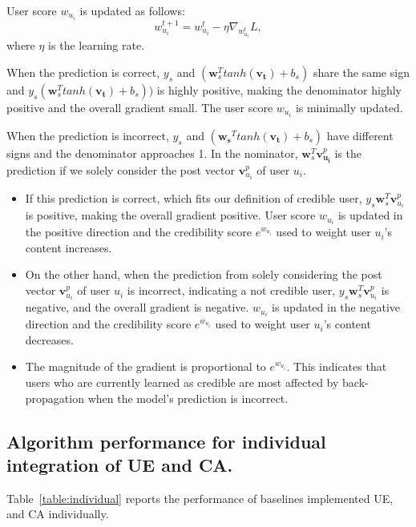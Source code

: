 \documentclass{bmcart}
\begin{document}
User score $w_{u_i}$ is updated as follows: 
\begin{equation}
    w^{t+1}_{u_i} = w^{t}_{u_i} - \eta\nabla_{w^{t}_{u_i}}L,
\end{equation}
where $\eta$ is the learning rate.

When the prediction is correct, $y_s$ and $(\boldsymbol{w}_{s}^T tanh(\boldsymbol{v_t})+b_s)$ share the same sign and $y_s(\boldsymbol{w}_{s}^T tanh(\boldsymbol{v_t})+b_s))$ is highly positive, making the denominator highly positive and the overall gradient small. The user score $w_{u_i}$ is minimally updated.

When the prediction is incorrect, $y_s$ and $(\boldsymbol{w_s}^T tanh(\boldsymbol{v_t})+b_s)$ have different signs and the denominator approaches 1. In the nominator, $\boldsymbol{w}_{s}^T \boldsymbol{v}^{p}_{\boldsymbol{u_i}}$ is the prediction if we solely consider the post vector $\boldsymbol{v}^{p}_{u_i}$ of user $u_i$. 
\begin{itemize}
    \item If this prediction is correct, which fits our definition of credible user, ${y_s}\boldsymbol{w}_{s}^T \boldsymbol{v}^{p}_{u_{i}}$ is positive, making the overall gradient positive. User score $w_{u_i}$ is updated in the positive direction and the credibility score $e^{w_{u_i}}$ used to weight user $u_i$'s content increases.
    \item On the other hand, when the prediction from solely considering the post vector $\boldsymbol{v}^{p}_{u_{i}}$ of user $u_i$ is incorrect, indicating a not credible user, ${y_s}\boldsymbol{w}_{s}^T \boldsymbol{v}^{p}_{u_{i}}$ is negative, and the overall gradient is negative. $w_{u_i}$ is updated in the negative direction and the credibility score $e^{w_{u_i}}$ used to weight user $u_i$'s content decreases.
    \item The magnitude of the gradient is proportional to $e^{w_{u_i}}$. This indicates that users who are currently learned as credible are most affected by back-propagation when the model's prediction is incorrect.
\end{itemize}

\subsection{Algorithm performance for individual integration of UE and CA.}\label{appendix:ue_ca}
Table~\ref{table:individual} reports the performance of baselines implemented UE, and CA individually.
\end{document}
